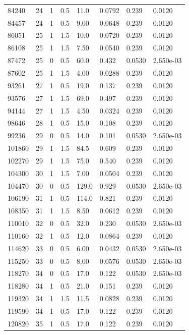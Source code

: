 \documentclass[preview]{standalone}
\begin{document}
{{{\begin{tabular}{L{1.2cm}C{1.2cm} C{0.3cm}C{0.5cm} C{1.4cm}C{1.4cm} C{1.4cm}C{1.4cm}}
  84240  &    24  & 1     & 0.5 &  11.0  & 0.0792  & 0.239 &  0.0120   \\ 
  84457  &    24  & 1     & 0.5 &  9.00  & 0.0648  & 0.239 &  0.0120   \\ 
  86051  &    25  & 1     & 1.5 &  10.0  & 0.0720  & 0.239 &  0.0120   \\ 
  86108  &    25  & 1     & 1.5 &  7.50  & 0.0540  & 0.239 &  0.0120   \\ 
  87472  &    25  & 0     & 0.5 &  60.0  & 0.432  & 0.0530 &  2.650e-03   \\ 
  87602  &    25  & 1     & 1.5 &  4.00  & 0.0288  & 0.239 &  0.0120   \\ 
  93261  &    27  & 1     & 0.5 &  19.0  & 0.137  & 0.239 &  0.0120   \\ 
  93576  &    27  & 1     & 1.5 &  69.0  & 0.497  & 0.239 &  0.0120   \\ 
  94144  &    27  & 1     & 1.5 &  4.50  & 0.0324  & 0.239 &  0.0120   \\ 
  98646  &    28  & 1     & 0.5 &  15.0  & 0.108  & 0.239 &  0.0120   \\ 
  99236  &    29  & 0     & 0.5 &  14.0  & 0.101  & 0.0530 &  2.650e-03   \\ 
  101860  &    29  & 1     & 1.5 &  84.5  & 0.609  & 0.239 &  0.0120   \\ 
  102270  &    29  & 1     & 1.5 &  75.0  & 0.540  & 0.239 &  0.0120   \\ 
  104300  &    30  & 1     & 1.5 &  7.00  & 0.0504  & 0.239 &  0.0120   \\ 
  104470  &    30  & 0     & 0.5 &  129.0  & 0.929  & 0.0530 &  2.650e-03   \\ 
  106190  &    31  & 1     & 0.5 &  114.0  & 0.821  & 0.239 &  0.0120   \\ 
  108350  &    31  & 1     & 1.5 &  8.50  & 0.0612  & 0.239 &  0.0120   \\ 
  110010  &    32  & 0     & 0.5 &  32.0  & 0.230  & 0.0530 &  2.650e-03   \\ 
  110160  &    32  & 1     & 0.5 &  12.0  & 0.0864  & 0.239 &  0.0120   \\ 
  114620  &    33  & 0     & 0.5 &  6.00  & 0.0432  & 0.0530 &  2.650e-03   \\ 
  115250  &    33  & 0     & 0.5 &  8.00  & 0.0576  & 0.0530 &  2.650e-03   \\ 
  118270  &    34  & 0     & 0.5 &  17.0  & 0.122  & 0.0530 &  2.650e-03   \\ 
  118280  &    34  & 1     & 0.5 &  21.0  & 0.151  & 0.239 &  0.0120   \\ 
  119320  &    34  & 1     & 1.5 &  11.5  & 0.0828  & 0.239 &  0.0120   \\ 
  119590  &    34  & 1     & 0.5 &  17.0  & 0.122  & 0.239 &  0.0120   \\ 
  120820  &    35  & 1     & 0.5 &  17.0  & 0.122  & 0.239 &  0.0120   \\ 
\hline 
\end{tabular} 

}}}
\end{document}
